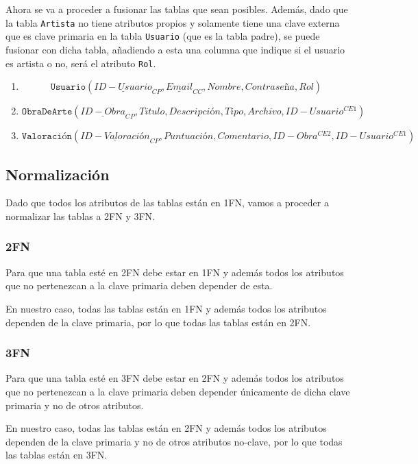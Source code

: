 \vspace{1cm}
Ahora se va a proceder a fusionar las tablas que sean posibles. Además,
dado que la tabla \texttt{Artista} no tiene atributos propios y solamente tiene
una clave externa que es clave primaria en la tabla \texttt{Usuario} (que es la
tabla padre), se puede fusionar con dicha tabla, añadiendo a esta una columna
que indique si el usuario es artista o no, será el atributo \texttt{Rol}.

\begin{enumerate}
    \item \[ \texttt{Usuario}(\underline{ID-Usuario}_{CP}, \underline{Email}_{CC}, Nombre, Contraseña, Rol) \]
    \item \[ \texttt{ObraDeArte}(\underline{ID-Obra}_{CP}, Titulo, Descripción, Tipo, Archivo, ID-Usuario^{CE1}) \]
    \item \[ \texttt{Valoración}(\underline{ID-Valoración}_{CP}, Puntuación, Comentario, ID-Obra^{CE2}, ID-Usuario^{CE1}) \]
\end{enumerate}

\subsection{Normalización}
Dado que todos los atributos de las tablas están en 1FN, vamos a proceder a
normalizar las tablas a 2FN y 3FN.

\subsubsection{2FN}
Para que una tabla esté en 2FN debe estar en 1FN y además todos los atributos
que no pertenezcan a la clave primaria deben depender de esta.

En nuestro caso, todas las tablas están en 1FN y además todos los atributos
dependen de la clave primaria, por lo que todas las tablas están en 2FN.

\subsubsection{3FN}
Para que una tabla esté en 3FN debe estar en 2FN y además todos los atributos
que no pertenezcan a la clave primaria deben depender únicamente de dicha
clave primaria y no de otros atributos.

En nuestro caso, todas las tablas están en 2FN y además todos los atributos
dependen de la clave primaria y no de otros atributos no-clave, por lo que
todas las tablas están en 3FN.

